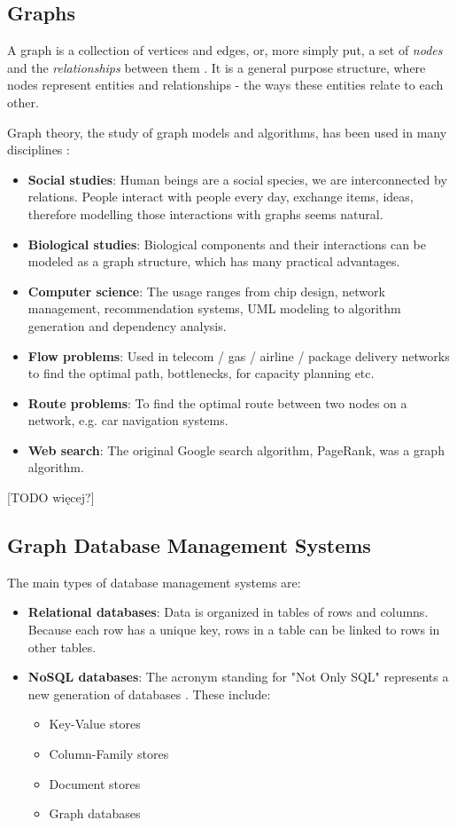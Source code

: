 \documentclass[12pt]{report}
\begin{document}
\subsection{Graphs}

A graph is a collection of vertices and edges, or, more simply put, a set of \textit{nodes} and the \textit{relationships} between them \cite{graph_databases}. It is a general purpose structure, where nodes represent entities and relationships - the ways these entities relate to each other.

Graph theory, the study of graph models and algorithms, has been used in many disciplines \cite{learning_neo4j}:
\begin{itemize}
\item {\bf Social studies}: Human beings are a social species, we are interconnected by relations. People interact with people every day, exchange items, ideas, therefore modelling those interactions with graphs seems natural.
\item {\bf Biological studies}: Biological components and their interactions can be modeled as a graph structure, which has many practical advantages.
\item {\bf Computer science}: The usage ranges from chip design, network management, recommendation systems, UML modeling to algorithm generation and dependency analysis.
\item {\bf Flow problems}: Used in telecom / gas / airline / package delivery networks to find the optimal path, bottlenecks, for capacity planning etc. 
\item {\bf Route problems}: To find the optimal route between two nodes on a network, e.g. car navigation systems.
\item {\bf Web search}: The original Google search algorithm, PageRank, was a graph algorithm.
\end{itemize}

[TODO więcej?]

\subsection{Graph Database Management Systems}

The main types of database management systems are:
\begin{itemize}
\item {\bf Relational databases}: Data is organized in tables of rows and columns. Because each row has a unique key, rows in a table can be linked to rows in other tables.
\item {\bf NoSQL databases}: The acronym standing for "Not Only SQL" represents a new generation of databases \cite{learning_neo4j}. These include:
\begin{itemize}
\item Key-Value stores
\item Column-Family stores
\item Document stores
\item Graph databases
\end{itemize}
\end{itemize}
\end{document}
